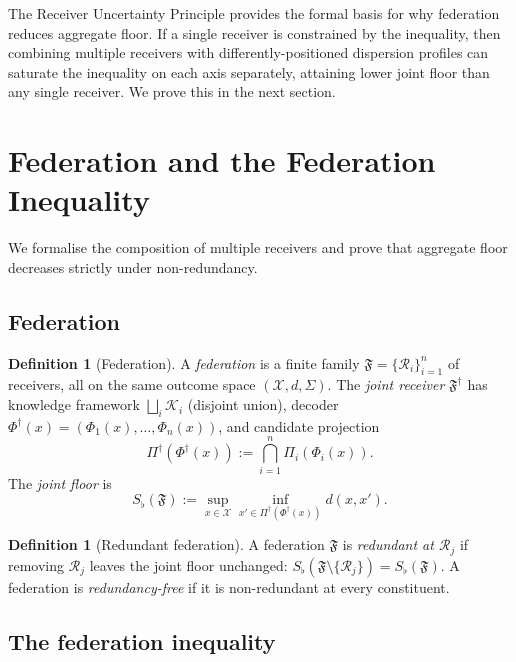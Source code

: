\documentclass[11pt,twocolumn,a4paper]{article}
\theoremstyle{definition}
\newtheorem{definition}[theorem]{Definition}
\theoremstyle{remark}
\newcommand{\Cands}{\mathcal{X}}
\newcommand{\Knowl}{\mathcal{K}}
\newcommand{\Federation}{\mathfrak{F}}
\newcommand{\receiver}{\mathcal{R}}
\newcommand{\Sigmax}{\Sigma}
\newcommand{\Sfloor}{S_{\flat}}
\begin{document}
The Receiver Uncertainty Principle provides the formal basis for why federation reduces aggregate floor. If a single receiver is constrained by the inequality, then combining multiple receivers with differently-positioned dispersion profiles can saturate the inequality on each axis separately, attaining lower joint floor than any single receiver. We prove this in the next section.


\section{Federation and the Federation Inequality}
\label{sec:federation}

We formalise the composition of multiple receivers and prove that aggregate floor decreases strictly under non-redundancy.

\subsection{Federation}

\begin{definition}[Federation]
\label{def:federation}
A \emph{federation} is a finite family $\Federation = \{\receiver_i\}_{i=1}^n$ of receivers, all on the same outcome space $(\Cands, d, \Sigmax)$. The \emph{joint receiver} $\Federation^\dagger$ has knowledge framework $\bigsqcup_i \Knowl_i$ (disjoint union), decoder $\Phi^\dagger(x) = (\Phi_1(x), \ldots, \Phi_n(x))$, and candidate projection
\[
\Pi^\dagger(\Phi^\dagger(x)) := \bigcap_{i=1}^n \Pi_i(\Phi_i(x)).
\]
The \emph{joint floor} is
\[
\Sfloor(\Federation) := \sup_{x \in \Cands} \inf_{x' \in \Pi^\dagger(\Phi^\dagger(x))} d(x, x').
\]
\end{definition}

\begin{definition}[Redundant federation]
\label{def:redundant}
A federation $\Federation$ is \emph{redundant at $\receiver_j$} if removing $\receiver_j$ leaves the joint floor unchanged: $\Sfloor(\Federation \setminus \{\receiver_j\}) = \Sfloor(\Federation)$. A federation is \emph{redundancy-free} if it is non-redundant at every constituent.
\end{definition}

\subsection{The federation inequality}
\end{document}
